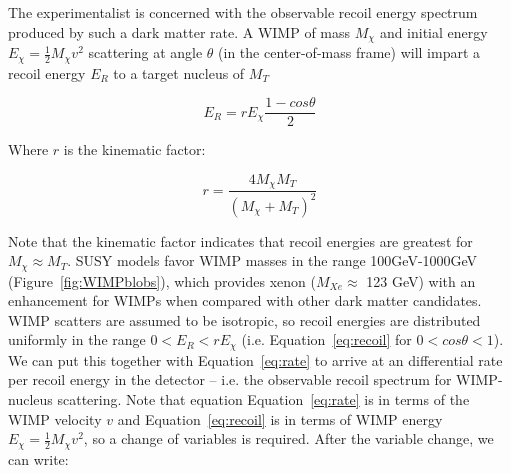 



The experimentalist is concerned with the observable recoil energy spectrum produced by such a dark matter rate. A \ac{WIMP} of mass $M_{\chi}$ and initial energy $E_{\chi} = \frac{1}{2}M_{\chi}v^{2}$ scattering at angle $\theta$ (in the center-of-mass frame) will impart a recoil energy $E_{R}$ to a target nucleus of $M_{T}$

\begin{equation}
\label{eq:recoil}
E_{R} = r E_{\chi} \frac{1 - cos\theta}{2}
\end{equation}

Where $r$ is the kinematic factor:

\begin{equation}
r = \frac{ 4 M_{\chi}M_{T} }{ (M_{\chi} + M_{T})^{2}}
\end{equation}

Note that the kinematic factor indicates that recoil energies are greatest for $M_{\chi} \approx M_{T}$. \ac{SUSY} models favor \ac{WIMP} masses in the range 100GeV-1000GeV (Figure~\ref{fig:WIMPblobs}), which provides xenon ($M_{Xe} \approx$ 123 GeV) with an enhancement for \ac{WIMP}s when compared with other dark matter candidates. \ac{WIMP} scatters are assumed to be isotropic, so recoil energies are distributed uniformly in the range $0 < E_{R} < rE_{\chi}$ (i.e. Equation~\ref{eq:recoil} for $0 < cos\theta < 1$). We can put this together with Equation~\ref{eq:rate} to arrive at an differential rate per recoil energy in the detector -- i.e. the observable recoil spectrum for \ac{WIMP}-nucleus scattering. Note that equation Equation~\ref{eq:rate} is in terms of the \ac{WIMP} velocity $v$ and Equation~\ref{eq:recoil} is in terms of \ac{WIMP} energy $E_{\chi} = \frac{1}{2}M_{\chi}v^{2}$, so a change of variables is required. After the variable change, we can write:

